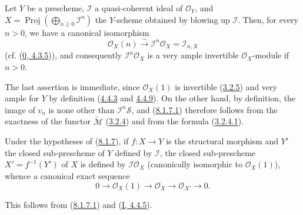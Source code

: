 
\begin{proposition}[8.1.7]
\label{II.8.1.7}
Let $Y$ be a prescheme, $\mathcal{I}$ a quasi-coherent ideal of
$\mathcal{O}_Y$, and $X=\operatorname{Proj}(\bigoplus_{n\geq0}\mathcal{I}^n)$ the
$Y$-scheme obtained by blowing up $\mathcal{I}$. Then, for every
$n>0$, we have a canonical isomorphism
\begin{equation}
\label{II.8.1.7.1}
  \mathcal{O}_X(n)\xrightarrow{\sim}\mathcal{I}^n\mathcal{O}_X
  =\mathcal{I}_{n,X}
\tag{8.1.7.1}
\end{equation}
(cf. (\hyperref[0.4.3.5]{0, 4.3.5})), and consequently
$\mathcal{I}^n\mathcal{O}_X$ is a very ample invertible $\mathcal{O}_X$-module
if $n>0$.
\end{proposition}

The last assertion is immediate, since $\mathcal{O}_X(1)$ is invertible
(\hyperref[II.3.2.5]{3.2.5}) and very ample for $Y$ by definition
(\hyperref[II.4.4.3]{4.4.3} and \hyperref[II.4.4.9]{4.4.9}). On the
other hand, by definition, the image of $v_n$ is none other than
$\mathcal{I}^n\mathcal{S}$, and (\hyperref[II.8.1.7.1]{8.1.7.1}) therefore follows
from the exactness of the functor $\widetilde{\mathcal{M}}$
(\hyperref[II.3.2.4]{3.2.4}) and from the formula
(\hyperref[II.3.2.4.1]{3.2.4.1}).

\begin{corollary}[8.1.8]
\label{II.8.1.8}
Under the hypotheses of (\hyperref[II.8.1.7]{8.1.7}), if $f:X\to Y$ is the
structural morphism and $Y'$ the closed sub-prescheme of $Y$ defined by
$\mathcal{I}$, the closed sub-prescheme $X'=f^{-1}(Y')$ of $X$ is defined by
$\mathcal{I}\mathcal{O}_X$ (canonically isomorphic to $\mathcal{O}_X(1)$),
whence a canonical exact sequence
\begin{equation}
\label{II.8.1.8.1}
  0\to\mathcal{O}_X(1)\to\mathcal{O}_X\to\mathcal{O}_{X'}\to0.
\tag{8.1.8.1}
\end{equation}
\end{corollary}

This follows from (\hyperref[II.8.1.7.1]{8.1.7.1}) and
(\hyperref[I.4.4.5]{I, 4.4.5}).

